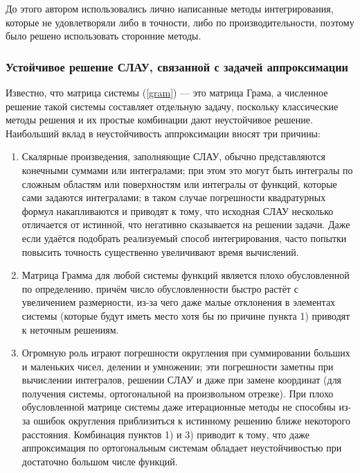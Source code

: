 \documentclass[a4paper, 12pt]{article}
\begin{document}
До этого автором использовались лично написанные методы интегрирования, которые  не удовлетворяли либо в точности, либо по производительности, поэтому было решено использовать сторонние методы.

\subsubsection{Устойчивое решение СЛАУ, связанной с задачей аппроксимации}

Известно, что матрица системы (\ref{gram}) --- это матрица Грама, а численное решение такой системы составляет отдельную задачу, поскольку классические методы решения и их простые комбинации дают неустойчивое решение.
Наибольший вклад в неустойчивость аппроксимации вносят три причины:

\begin{enumerate}
\item  Скалярные произведения, заполняющие СЛАУ, обычно представляются конечными суммами или интегралами; при этом это могут быть интегралы по сложным областям или поверхностям или интегралы от функций, которые сами задаются интегралами; в таком случае погрешности квадратурных формул накапливаются и приводят к тому, что исходная СЛАУ несколько отличается от истинной, что негативно сказывается на решении задачи. Даже если удаётся подобрать реализуемый способ интегрирования, часто попытки повысить точность существенно увеличивают время вычислений.

\item  Матрица Грамма для любой системы функций является плохо обусловленной по определению, причём число обусловленности быстро растёт с увеличением размерности, из-за чего даже малые отклонения в элементах системы (которые будут иметь место хотя бы по причине пункта 1) приводят к неточным решениям.

\item  Огромную роль играют погрешности округления при суммировании больших и маленьких чисел, делении и умножении; эти погрешности заметны при вычислении интегралов, решении СЛАУ и даже при замене координат (для получения системы, ортогональной на произвольном отрезке).
При плохо обусловленной матрице системы даже итерационные методы не способны из-за ошибок округления приблизиться к истинному решению ближе некоторого расстояния. Комбинация пунктов 1) и 3) приводит к тому, что даже аппроксимация по  ортогональным системам обладает неустойчивостью при достаточно большом числе функций.
\end{enumerate}
\end{document}
